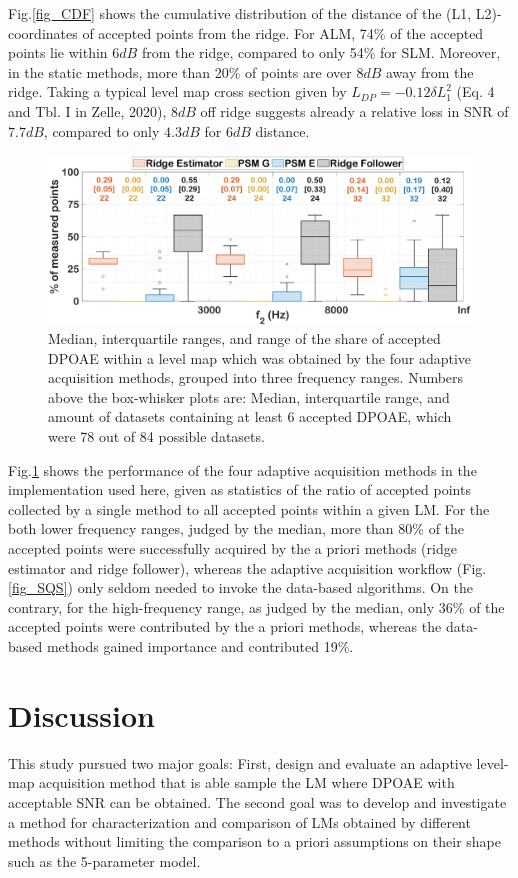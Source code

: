 \documentclass[journal,twoside,web]{ieeecolor2}
\begin{document}
Fig.\ref{fig_CDF} shows the cumulative distribution of the distance of the (L1, L2)-coordinates of accepted points from the ridge.
For ALM, 74\% of the accepted points lie within $6 dB$ from the ridge, compared to only 54\% for SLM.
Moreover, in the static methods, more than 20\% of points are over $8 dB$ away from the ridge.
Taking a typical level map cross section given by $L_{DP} =-0.12 \delta L_1^2$ (Eq.
4 and Tbl.
I in Zelle, 2020), $8 dB$ off ridge suggests already a relative loss in SNR of $7.7 dB$, compared to only $4.3 dB$ for $6 dB$ distance.

\begin{figure}[ht]
\centerline{\includegraphics[width=\columnwidth]{Fig_10_Boxplots.eps}}
\caption{Median, interquartile ranges, and range of the share of accepted DPOAE within a level map which was obtained by the four adaptive acquisition methods, grouped into three frequency ranges.
Numbers above the box-whisker plots are: Median, interquartile range, and amount of datasets containing at least 6 accepted DPOAE, which were 78 out of 84 possible datasets.}
\label{fig_BXP}
\end{figure}

Fig.\ref{fig_BXP} shows the performance of the four adaptive acquisition methods in the implementation used here, given as statistics of the ratio of accepted points collected by a single method to all accepted points within a given LM.
For the both lower frequency ranges, judged by the median, more than 80\% of the accepted points were successfully acquired by the a priori methods (ridge estimator and ridge follower), whereas the adaptive acquisition workflow (Fig.\ref{fig_SQS}) only seldom needed to invoke the data-based algorithms.
On the contrary, for the high-frequency range, as judged by the median, only 36\% of the accepted points were contributed by the a priori methods, whereas the data-based methods gained importance and contributed 19\%.

\section{Discussion}
This study pursued two major goals: First, design and evaluate an adaptive level-map acquisition method that is able sample the LM where DPOAE with acceptable SNR can be obtained.
The second goal was to develop and investigate a method for characterization and comparison of LMs obtained by different methods without limiting the comparison to a priori assumptions on their shape such as the 5-parameter model.
\end{document}
